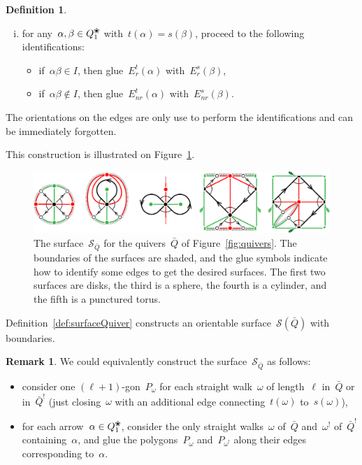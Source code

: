 \documentclass{amsart}
\theoremstyle{definition}
\newtheorem{definition}[theorem]{Definition}
\newtheorem{remark}[theorem]{Remark}
\newcommand{\fref}[1]{Figure~\ref{#1}} %
\newcommand{\blossom}{^\text{\ding{96}}} %
\newcommand{\Enrs}[1]{E_{nr}^{s}(#1)}
\newcommand{\Ers}[1]{E_{r}^{s}(#1)}
\newcommand{\Enrt}[1]{E_{nr}^{t}(#1)}
\newcommand{\Ert}[1]{E_{r}^{t}(#1)}
\newcommand{\surface}{\mathcal{S}} %
\newcommand{\koszul}{^!} %
\begin{document}
\begin{definition}
\begin{enumerate}[(i)]
\item for any~$\alpha, \beta \in Q_1\blossom$ with~$t(\alpha) = s(\beta)$, proceed to the following identifications:
    \begin{itemize}
    \item if~$\alpha\beta \in I$, then glue~$\Ert{\alpha}$ with~$\Ers{\beta}$,
    \item if~$\alpha\beta \notin I$, then glue~$\Enrt{\alpha}$ with~$\Enrs{\beta}$.
    \end{itemize}
\end{enumerate}
The orientations on the edges are only use to perform the identifications and can be immediately forgotten.
\end{definition}

This construction is illustrated on \fref{fig:surfaces}.
%
\begin{figure}[t]
	\capstart
	\centerline{\includegraphics[scale=.7]{surfaces}}
	\caption{The surface~$\surface_{\bar Q}$ for the quivers~$\bar Q$ of \fref{fig:quivers}. The boundaries of the surfaces are shaded, and the glue symbols indicate how to identify some edges to get the desired surfaces. The first two surfaces are disks, the third is a sphere, the fourth is a cylinder, and the fifth is a punctured torus.}
	\label{fig:surfaces}
\end{figure}

Definition~\ref{def:surfaceQuiver} constructs an orientable surface~$\surface(\bar Q)$ with boundaries.

\begin{remark}
We could equivalently construct the surface~$\surface_{\bar Q}$ as follows:
\begin{itemize}
\item consider one $(\ell+1)$-gon~$P_\omega$ for each straight walk~$\omega$ of length~$\ell$ in~$\bar Q$ or in~$\bar Q\koszul$ (just closing~$\omega$ with an additional edge connecting~$t(\omega)$ to~$s(\omega)$),
\item for each arrow~$\alpha \in Q_1\blossom$, consider the only straight walks~$\omega$ of~$\bar Q$ and~$\omega\koszul$ of~$\bar Q\koszul$ containing~$\alpha$, and glue the polygons~$P_\omega$ and~$P_{\omega\koszul}$ along their edges corresponding to~$\alpha$.
\end{itemize}
\end{remark}
\end{document}
